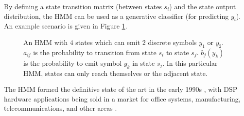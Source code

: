 \documentclass[12pt]{llncs}
\begin{document}
By defining a state transition matrix (between states $s_i$) and the state output distribution, the HMM can be used as a generative classifier (for predicting $y_i$). An example scenario is given in Figure \ref{fig:HMM}.

\begin{figure}[htbp]
\begin{center}
\end{center}
\caption{An HMM with 4 states which can emit 2 discrete symbols $y_1$ or $y_2$.
$a_{ij}$ is the probability to transition from state $s_i$ to state $s_j$.
$b_j(y_k)$ is the probability to emit symbol $y_k$ in state $s_j$.
In this particular HMM, states can only reach themselves or the adjacent state.}
\label{fig:HMM}
\end{figure}







The HMM formed the definitive state of the art in the early 1990s \cite{rabiner1989tutorial}, with DSP hardware applications being sold in a market for office systems, manufacturing, telecommunications, and other areas \cite[p.487]{rabiner1993fundamentals}. 

\end{document}
